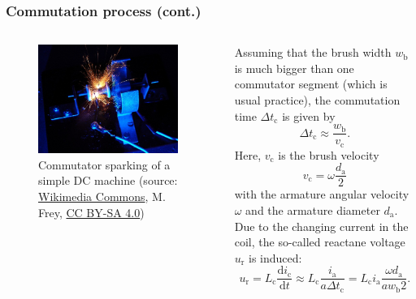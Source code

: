 \begin{frame}
	\frametitle{Commutation process (cont.)}
	\begin{columns}
		\begin{column}{0.4\textwidth}
			\begin{figure}
				\centering
				\includegraphics[width=0.95\textwidth]{fig/lec03/Commutator_sparking.jpg}
				\caption{Commutator sparking of a simple DC machine (source: \href{https://commons.wikimedia.org/wiki/File:Bürstenfeuer_eines_einfachen_Elektromotors.JPG}{Wikimedia Commons}, M. Frey, \href{https://creativecommons.org/licenses/by-sa/4.0/deed.den}{CC BY-SA 4.0})} 
				\label{fig:Commutator_sparking}
			\end{figure}
		\end{column}
		\begin{column}{0.6\textwidth}
			Assuming that the brush width $w_\mathrm{b}$ is much bigger than one commutator segment (which is usual practice), the commutation time $\Delta t_\mathrm{c}$ is given by
			\begin{equation}
				\Delta t_\mathrm{c} \approx \frac{w_\mathrm{b}}{v_\mathrm{c}}.
			\end{equation}\pause
			Here, $v_\mathrm{c}$ is the brush velocity
			\begin{equation}
				v_\mathrm{c} = \omega \frac{d_\mathrm{a}}{2}
			\end{equation}
			with the armature angular velocity $\omega$ and the armature diameter $d_\mathrm{a}$. \pause Due to the changing current in the coil, the so-called reactane voltage $u_\mathrm{r}$ is induced:
			\begin{equation}
				u_\mathrm{r} = L_\mathrm{c} \frac{\mathrm{d}i_\mathrm{c}}{\mathrm{d}t} \approx L_\mathrm{c} \frac{i_\mathrm{a}}{a \Delta t_\mathrm{c}} = L_\mathrm{c} i_\mathrm{a} \frac{\omega d_\mathrm{a}}{a w_\mathrm{b}2}.
				\label{eq:reactance_voltage_commutation}
			\end{equation}
		\end{column}
	\end{columns}
\end{frame}

